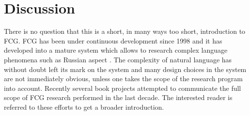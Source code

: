 \section{Discussion}
There is no question that this is a short, in many ways too short,
introduction to FCG. FCG has been under continuous development
since 1998 and it has developed into a mature system which allows 
to research complex language phenomena such as Russian aspect 
\citep{gerasymova2010acquisition,gerasymova2012temporal}. The complexity of natural 
language has without doubt left its mark on the system and many design 
choices in the system are not immediately obvious,
unless one takes the scope of the research program into account.
Recently several book projects \citep{steels2011design,steels2012computational}
attempted to communicate the full scope of FCG research
performed in the last decade. The interested reader is referred
to these efforts to get a broader introduction.

%
% 
%